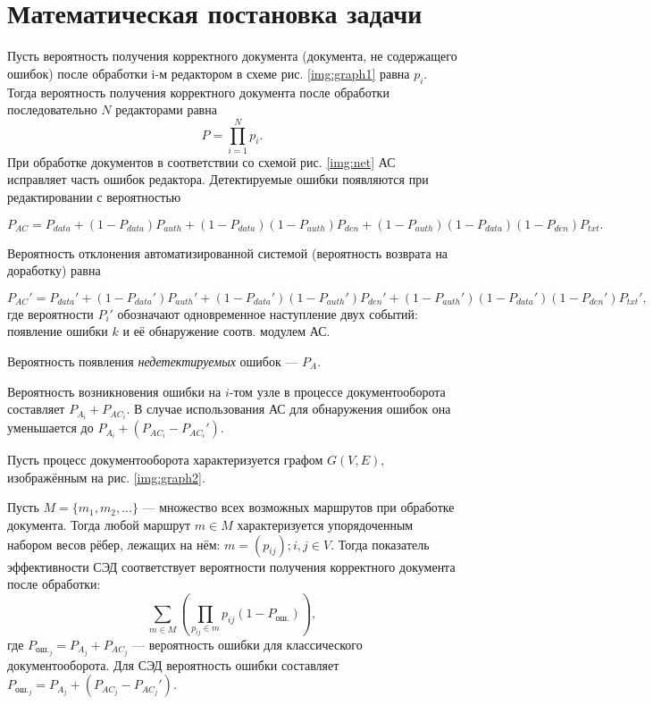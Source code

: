 \section{Математическая постановка задачи} \label{math}

Пусть вероятность получения корректного документа (документа, не содержащего ошибок) после обработки i-м редактором в схеме рис. \ref{img:graph1} равна $p_i$. Тогда вероятность получения корректного документа после обработки последовательно $N$ редакторами равна
$$
P=\prod_{i=1}^N p_i.
$$
При обработке документов в соответствии со схемой рис. \ref{img:net} АС исправляет часть ошибок редактора. Детектируемые ошибки появляются при редактировании с вероятностью

\begin{equation}
  \label{eq:equation3}
P_{AC}=P_{data}+(1-P_{data})P_{auth}+(1-P_{data})(1-P_{auth})P_{den}+(1-P_{auth})(1-P_{data})(1-P_{den})P_{txt}.
\end{equation}

Вероятность отклонения автоматизированной системой (вероятность возврата на доработку) равна

\begin{equation}
  \label{eq:equation4}
P_{AC}'=P_{data}'+(1-P_{data}')P_{auth}'+(1-P_{data}')(1-P_{auth}')P_{den}'+(1-P_{auth}')(1-P_{data}')(1-P_{den}')P_{txt}',
\end{equation}
где вероятности $P_i'$ обозначают одновременное наступление двух событий: появление ошибки $k$ и её обнаружение соотв. модулем АС.

\vspace{\baselineskip}
Вероятность появления \textit{недетектируемых} ошибок --- $P_A$.

\vspace{\baselineskip}
Вероятность возникновения ошибки на $i$-том узле в процессе документооборота составляет $P_{A_i}+P_{{AC}_i}$. В случае использования АС для обнаружения ошибок она уменьшается до $P_{A_i}+(P_{{AC}_i}-P_{{AC}_i}')$.

\vspace{\baselineskip}
Пусть процесс документооборота характеризуется графом $G(V,E)$, изображённым на рис. \ref{img:graph2}.

\vspace{\baselineskip}
Пусть $M = \{m_1, m_2, ... \}$ — множество всех возможных маршрутов при обработке документа. Тогда любой маршрут $m \in M$ характеризуется упорядоченным набором весов рёбер, лежащих на нём: $m=(p_{ij}); i,j \in V$. Тогда показатель эффективности СЭД соответствует вероятности получения корректного документа после обработки:
$$
\sum_{m \in M} (\prod_{p_{ij} \in m} p_{ij}(1-P_{\textrm{ош.}})),
$$
где $P_{{\textrm{ош.}}_j}=P_{A_j}+P_{{AC}_j}$ --- вероятность ошибки для классического документооборота. Для СЭД вероятность ошибки составляет $P_{{\textrm{ош.}}_j}=P_{A_j}+(P_{{AC}_j}-P_{{AC}_j}')$.


